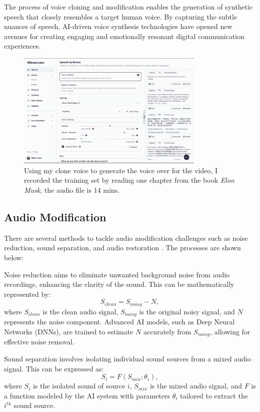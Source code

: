 \documentclass[11pt,a4paper,oneside]{report}
\begin{document}
The process of voice cloning and modification enables the generation of synthetic speech that closely resembles a target human voice. 
By capturing the subtle nuances of speech, AI-driven voice synthesis technologies have opened new avenues for creating engaging and emotionally resonant digital communication experiences. 

\begin{figure}[htbp]
  \centering
  \includegraphics[width=0.8\textwidth]{ElevenLabs.png}
  \caption{Using my clone voice to generate the voice over for the video, I recorded the training set by reading one chapter from the book \textit{Elon Musk}, the audio file is 14 mins.}
\end{figure}

\subsection{Audio Modification}

There are several methods to tackle audio modification challenges such as noise reduction, sound separation, and audio restoration \cite{godsill2002digital}. 
The processes are shown below:

Noise reduction aims to eliminate unwanted background noise from audio recordings, enhancing the clarity of the sound. This can be mathematically represented by:
\begin{equation}
S_{clean} = S_{noisy} - N,
\end{equation}
where $S_{clean}$ is the clean audio signal, $S_{noisy}$ is the original noisy signal, and $N$ represents the noise component. Advanced AI models, such as Deep Neural Networks (DNNs), are trained to estimate $N$ accurately from $S_{noisy}$, allowing for effective noise removal.

Sound separation involves isolating individual sound sources from a mixed audio signal. This can be expressed as:
\begin{equation}
S_i = F(S_{mix}; \theta_i),
\end{equation}
where $S_i$ is the isolated sound of source $i$, $S_{mix}$ is the mixed audio signal, and $F$ is a function modeled by the AI system with parameters $\theta_i$ tailored to extract the $i^{th}$ sound source.
\end{document}
